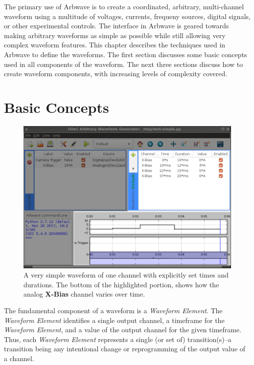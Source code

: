 \thispagestyle{fancy}
\pagestyle{fancy}

The primary use of Arbwave is to create a coordinated, arbitrary, multi-channel
waveform using a multitude of voltages, currents, frequeny sources, digital
signals, or other experimental controls.  The interface in Arbwave is geared
towards making arbitrary waveforms as simple as possible while still allowing
very complex waveform features.  This chapter describes the techniques used in
Arbwave to define the waveforms.  The first section discusses some basic
concepts used in all components of the waveform.  The next three sections discuss
how to create waveform components, with increasing levels of complexity covered.

\section{Basic Concepts}
\begin{figure}[ht!]
  \centerline{\includegraphics[width=.8\textwidth]{figures/basic-waveform}}
  \caption[Very simple waveform]{
    A very simple waveform of one channel with explicitly set times and
    durations.  The bottom of the highlighted portion, shows how the analog
    \textbf{X-Bias} channel varies over time.
  }
  \label{fig:waveforms:basic}
\end{figure}

The fundamental component of a waveform is a \textit{Waveform Element}.  The
\textit{Waveform Element} identifies a single output channel, a timeframe for
the \textit{Waveform Element}, and a value of the output channel for the given
timeframe.  Thus, each \textit{Waveform Element} represents a single (or set of)
transition(s)--a transition being any intentional change or reprogramming of the
output value of a channel.

